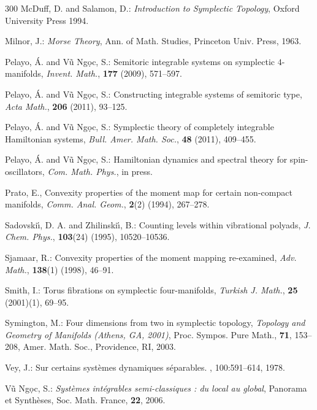 \documentclass[11pt]{article}
\begin{document}
{\begin{thebibliography}{300}
   McDuff, D. and Salamon, D.: \textit{Introduction
      to Symplectic Topology}, Oxford University Press 1994.

   Milnor, J.: \textit{Morse Theory}, Ann. of
    Math. Studies, Princeton Univ. Press, 1963.

   Pelayo, {\'A}. and V\~ u Ng\d oc, S.: Semitoric
    integrable systems on symplectic $4$-manifolds,
    \textit{Invent. Math.}, {\bf 177} (2009), 571--597.

   Pelayo, {\'A}. and V\~{u} Ng\d{o}c, S.:
    Constructing integrable systems of semitoric type, \textit{Acta
      Math.}, \textbf{206} (2011), 93--125.

   Pelayo, {\'A}. and V\~ u Ng\d oc, S.: Symplectic
    theory of completely integrable Hamiltonian systems,
    \textit{Bull. Amer. Math. Soc.}, {\bf 48} (2011), 409--455.

   Pelayo, {\'A}. and V\~ u Ng\d oc, S.:
    Hamiltonian dynamics and spectral theory for spin-oscillators,
    \textit{Com. Math. Phys.}, in press.

   Prato, E., Convexity properties of the moment
    map for certain non-compact manifolds, \textit{Comm. Anal. Geom.},
    \textbf{2}(2) (1994), 267--278.

   Sadovski{\'\i}, D. A. and Zhilinski{\'\i}, B.:
    Counting levels within vibrational polyads,
    \textit{J. Chem. Phys.}, {\bf 103}(24) (1995), 10520--10536.

   Sjamaar, R.: Convexity properties of the
    moment mapping re-examined, \textit{Adv. Math.}, \textbf{138}(1)
    (1998), 46--91.

   Smith, I.: Torus fibrations on symplectic
    four-manifolds, \textit{Turkish J. Math.}, {\bf 25} (2001)(1),
    69--95.
    
   Symington, M.: Four dimensions from two in
    symplectic topology, \textit{Topology and Geometry of Manifolds
      (Athens, GA, 2001)}, Proc. Sympos. Pure Math., \textbf{71},
    153--208, Amer. Math. Soc., Providence, RI, 2003.

    Vey, J.: \newblock Sur certains syst{\`e}mes
     dynamiques s{\'e}parables.  ,
     100:591--614, 1978.

   V\~{u} Ng\d{o}c, S.: \textit{Syst\`emes
      int\'egrables semi-classiques : du local au global}, Panorama et
    Synth\`eses, Soc. Math. France, \textbf{22}, 2006.


\end{thebibliography}}
\end{document}

